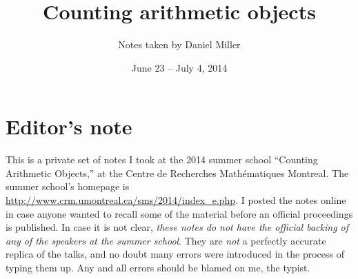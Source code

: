 \documentclass{article}
\title{Counting arithmetic objects}
\date{June 23 -- July 4, 2014}
\author{Notes taken by Daniel Miller}
\theoremstyle{definition}
\begin{document}
\setcounter{tocdepth}{1}
\maketitle
\tableofcontents





\section*{Editor's note}

This is a private set of notes I took at the 2014 summer school 
``Counting Arithmetic Objects,'' at the Centre de Recherches Math\'ematiques 
Montreal. The summer school's homepage is 
\url{http://www.crm.umontreal.ca/sms/2014/index_e.php}. I posted the notes 
online in case anyone wanted to recall some of the material before an official 
proceedings is published. In case it is not clear, \emph{these notes do not 
have the official backing of any of the speakers at the summer school}. They 
are \emph{not} a perfectly accurate replica of the talks, and no doubt many 
errors were introduced in the process of typing them up. Any and all errors 
should be blamed on me, the typist. 















































\end{document}
